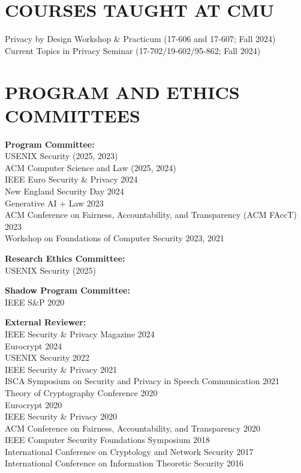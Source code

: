 \documentclass{res}
\begin{document}
\begin{resume}
\section{COURSES TAUGHT AT CMU}
Privacy by Design Workshop \& Practicum (17-606 and 17-607; Fall 2024) \\
Current Topics in Privacy Seminar (17-702/19-602/95-862; Fall 2024)



\section{PROGRAM AND ETHICS COMMITTEES}
\vspace{0.1in}

\textbf{Program Committee:} \\
USENIX Security (2025, 2023) \\
ACM Computer Science and Law (2025, 2024) \\
IEEE Euro Security \& Privacy 2024 \\
New England Security Day 2024 \\
Generative AI + Law 2023 \\
ACM Conference on Fairness, Accountability, and Transparency (ACM FAccT) 2023 \\
Workshop on Foundations of Computer Security 2023, 2021

\textbf{Research Ethics Committee:} \\
USENIX Security (2025)

\textbf{Shadow Program Committee:} \\
IEEE S\&P 2020

\textbf{External Reviewer:} \\
IEEE Security \& Privacy Magazine 2024 \\
Eurocrypt 2024 \\
USENIX Security 2022 \\
IEEE Security \& Privacy 2021 \\
ISCA Symposium on Security and Privacy in Speech Communication 2021 \\
Theory of Cryptography Conference 2020 \\
Eurocrypt 2020 \\
IEEE Security \& Privacy 2020 \\
ACM Conference on Fairness, Accountability, and Transparency 2020 \\
IEEE Computer Security Foundations Symposium 2018 \\
International Conference on Cryptology and Network Security 2017 \\
International Conference on Information Theoretic Security 2016



\end{resume}
\end{document}

